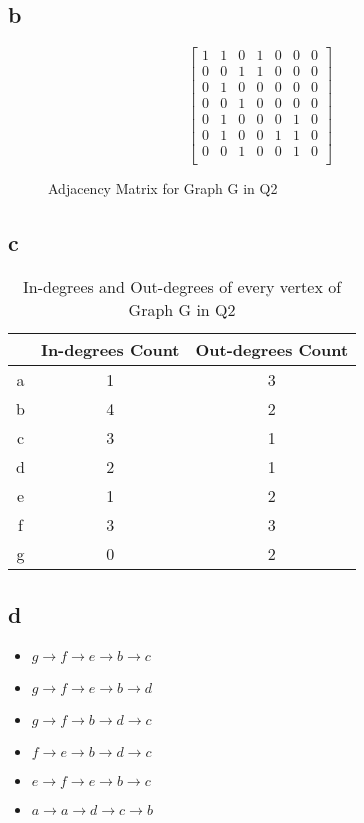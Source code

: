 \documentclass[11pt]{article}
\begin{document}
\subsection*{b}
\begin{figure}[H]
$$  \begin{bmatrix}
        1 & 1 & 0 & 1 & 0 & 0 & 0 \\
        0 & 0 & 1 & 1 & 0 & 0 & 0 \\
        0 & 1 & 0 & 0 & 0 & 0 & 0 \\
        0 & 0 & 1 & 0 & 0 & 0 & 0 \\
        0 & 1 & 0 & 0 & 0 & 1 & 0 \\
        0 & 1 & 0 & 0 & 1 & 1 & 0 \\
        0 & 0 & 1 & 0 & 0 & 1 & 0 \\
    \end{bmatrix} $$
    \caption{Adjacency Matrix for Graph G in Q2}
\end{figure}

\subsection*{c}
\begin{table}[H]
    \centering
    \begin{tabular}{|c|c|c|}	
    \hline 							
    & \textbf{In-degrees Count} & \textbf{Out-degrees Count}  \\
    \hline 
    \hline 
    a & 1 & 3 \\ \hline
    b & 4 & 2 \\ \hline
    c & 3 & 1 \\ \hline
    d & 2 & 1 \\ \hline
    e & 1 & 2 \\ \hline
    f & 3 & 3 \\ \hline
    g & 0 & 2 \\ \hline
    \end{tabular}
    \caption{ In-degrees and Out-degrees of every vertex of Graph G in Q2 }
    \end{table}

\subsection*{d}
\begin{itemize}
    \item $g \rightarrow f \rightarrow e \rightarrow b \rightarrow c$
    \item $g \rightarrow f \rightarrow e \rightarrow b \rightarrow d$
    \item $g \rightarrow f \rightarrow b \rightarrow d \rightarrow c$
    \item $f \rightarrow e \rightarrow b \rightarrow d \rightarrow c$
    \item $e \rightarrow f \rightarrow e \rightarrow b \rightarrow c$
    \item $a \rightarrow a \rightarrow d \rightarrow c \rightarrow b$
\end{itemize}
\end{document}
